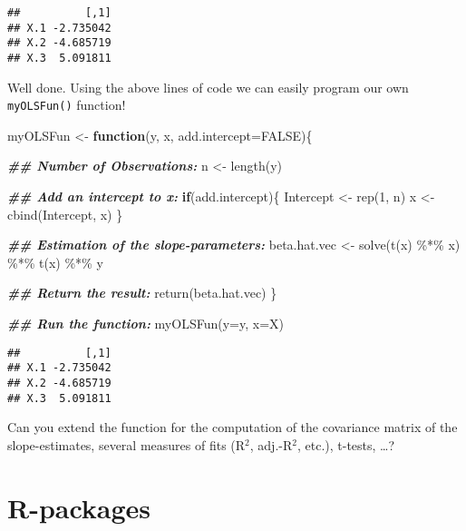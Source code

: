 \documentclass[
]{book}
\newenvironment{Shaded}{\begin{snugshade}}{\end{snugshade}}
\newcommand{\AttributeTok}[1]{\textcolor[rgb]{0.77,0.63,0.00}{#1}}
\newcommand{\ConstantTok}[1]{\textcolor[rgb]{0.00,0.00,0.00}{#1}}
\newcommand{\ControlFlowTok}[1]{\textcolor[rgb]{0.13,0.29,0.53}{\textbf{#1}}}
\newcommand{\DecValTok}[1]{\textcolor[rgb]{0.00,0.00,0.81}{#1}}
\newcommand{\DocumentationTok}[1]{\textcolor[rgb]{0.56,0.35,0.01}{\textbf{\textit{#1}}}}
\newcommand{\FunctionTok}[1]{\textcolor[rgb]{0.00,0.00,0.00}{#1}}
\newcommand{\NormalTok}[1]{#1}
\newcommand{\OtherTok}[1]{\textcolor[rgb]{0.56,0.35,0.01}{#1}}
\newcommand{\SpecialCharTok}[1]{\textcolor[rgb]{0.00,0.00,0.00}{#1}}
\begin{document}
\begin{verbatim}
##          [,1]
## X.1 -2.735042
## X.2 -4.685719
## X.3  5.091811
\end{verbatim}

\hfill\break

Well done. Using the above lines of code we can easily program our own \texttt{myOLSFun()} function!

\begin{Shaded}
\begin{Highlighting}[]
\NormalTok{myOLSFun }\OtherTok{\textless{}{-}} \ControlFlowTok{function}\NormalTok{(y, x, }\AttributeTok{add.intercept=}\ConstantTok{FALSE}\NormalTok{)\{}
  
  \DocumentationTok{\#\# Number of Observations:}
\NormalTok{  n         }\OtherTok{\textless{}{-}} \FunctionTok{length}\NormalTok{(y)}
  
  \DocumentationTok{\#\# Add an intercept to x:}
  \ControlFlowTok{if}\NormalTok{(add.intercept)\{}
\NormalTok{    Intercept }\OtherTok{\textless{}{-}} \FunctionTok{rep}\NormalTok{(}\DecValTok{1}\NormalTok{, n)}
\NormalTok{    x         }\OtherTok{\textless{}{-}} \FunctionTok{cbind}\NormalTok{(Intercept, x)}
\NormalTok{  \}}
  
  \DocumentationTok{\#\# Estimation of the slope{-}parameters:}
\NormalTok{  beta.hat.vec }\OtherTok{\textless{}{-}} \FunctionTok{solve}\NormalTok{(}\FunctionTok{t}\NormalTok{(x) }\SpecialCharTok{\%*\%}\NormalTok{ x) }\SpecialCharTok{\%*\%} \FunctionTok{t}\NormalTok{(x) }\SpecialCharTok{\%*\%}\NormalTok{ y}
  
  \DocumentationTok{\#\# Return the result:}
  \FunctionTok{return}\NormalTok{(beta.hat.vec)}
\NormalTok{\}}

\DocumentationTok{\#\# Run the function:}
\FunctionTok{myOLSFun}\NormalTok{(}\AttributeTok{y=}\NormalTok{y, }\AttributeTok{x=}\NormalTok{X)}
\end{Highlighting}
\end{Shaded}

\begin{verbatim}
##          [,1]
## X.1 -2.735042
## X.2 -4.685719
## X.3  5.091811
\end{verbatim}

\hfill\break

Can you extend the function for the computation of the covariance matrix of the slope-estimates, several measures of fits (R\(^2\), adj.-R\(^2\), etc.), t-tests, \ldots?

\hypertarget{r-packages}{%
\section{R-packages}\label{r-packages}}
\end{document}
